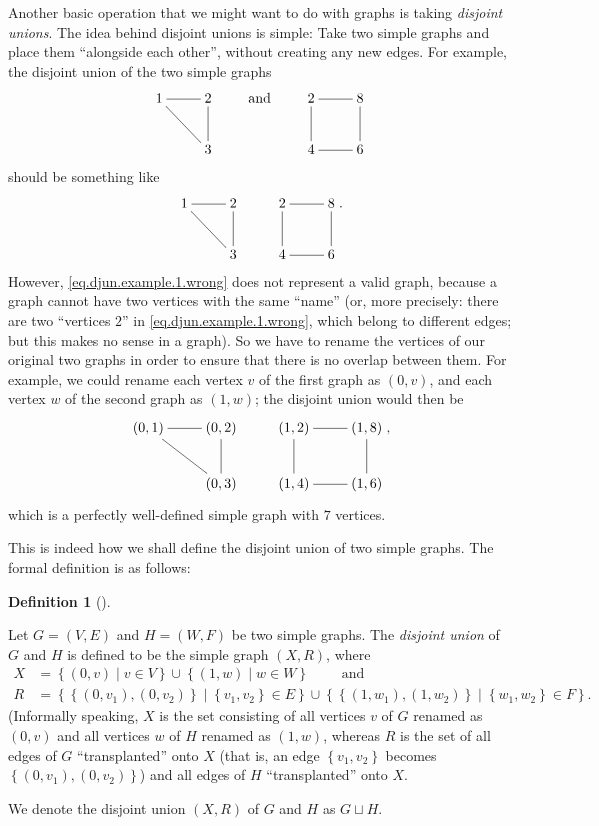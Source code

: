 \documentclass[numbers=enddot,12pt,final,onecolumn,notitlepage]{scrartcl}%
\makeatletter
\theoremstyle{definition}
\newtheorem{defi}[theo]{Definition}
\newenvironment{definition}[1][]
{\begin{defi}[#1]\begin{leftbar}}
{\end{leftbar}\end{defi}}
\newcommand{\set}[1]{\left\{ #1 \right\}}
\newcommand{\tup}[1]{\left( #1 \right)}
\newcommand{\are}{\ar@{-}}
\makeatother
\begin{document}
Another basic operation that we might want to do with graphs is
taking \textit{disjoint unions}.
The idea behind disjoint unions is simple:
Take two simple graphs and place them ``alongside each other'',
without creating any new edges.
For example, the disjoint union of the two simple graphs
\begin{equation}
\xymatrix{
1 \are[r] \are[rd] & 2 \are[d] \\
& 3
}
\qquad \text{ and } \qquad
\xymatrix{
2 \are[r] \are[d] & 8 \are[d] \\
4 \are[r] & 6
}
\label{eq.djun.example.1.two-graphs}
\end{equation}
should be something like
\begin{equation}
\xymatrix{
1 \are[r] \are[rd] & 2 \are[d] & 2 \are[r] \are[d] & 8 \are[d] \\
& 3 & 4 \are[r] & 6
} .
\label{eq.djun.example.1.wrong}
\end{equation}
However, \eqref{eq.djun.example.1.wrong} does not represent a
valid graph, because a graph cannot have two vertices with the
same ``name'' (or, more precisely: there are two
``vertices $2$'' in \eqref{eq.djun.example.1.wrong},
which belong to different edges; but this makes no sense
in a graph).
So we have to rename the vertices of our original two graphs
in order to ensure that there is no overlap between them.
For example, we could rename each vertex $v$ of the first graph
as $\tup{0, v}$, and each vertex $w$ of the second graph as
$\tup{1, w}$;
the disjoint union would then be
\begin{equation}
\xymatrix{
\tup{0,1} \are[r] \are[rd] & \tup{0,2} \are[d] & \tup{1,2} \are[r] \are[d] & \tup{1,8} \are[d] \\
& \tup{0,3} & \tup{1,4} \are[r] & \tup{1,6}
} ,
\label{eq.djun.example.1.right}
\end{equation}
which is a perfectly well-defined simple graph with $7$
vertices.

This is indeed how we shall define the disjoint union of two
simple graphs.
The formal definition is as follows:

\begin{definition} \label{def.djun.simple}
Let $G = \tup{V, E}$ and $H = \tup{W, F}$ be two simple graphs.
The \textit{disjoint union} of $G$ and $H$ is defined to be
the simple graph $\tup{X, R}$, where
\begin{align*}
X &= \set{ \tup{0, v} \mid v \in V } \cup \set{ \tup{1, w} \mid w \in W }
\qquad \text{ and} \\
R &= \set{ \set{\tup{0, v_1}, \tup{0, v_2}} \mid \set{v_1, v_2} \in E }
     \cup
	 \set{ \set{\tup{1, w_1}, \tup{1, w_2}} \mid \set{w_1, w_2} \in F } .
\end{align*}
(Informally speaking, $X$ is the set consisting of all vertices
$v$ of $G$ renamed as $\tup{0, v}$ and all vertices $w$ of $H$
renamed as $\tup{1, w}$, whereas $R$ is the set of all edges
of $G$ ``transplanted'' onto $X$ (that is, an edge $\set{v_1, v_2}$
becomes $\set{\tup{0, v_1}, \tup{0, v_2}}$) and all edges of $H$
``transplanted'' onto $X$.

We denote the disjoint union $\tup{X, R}$ of $G$ and $H$ as
$G \sqcup H$.
\end{definition}
\end{document}
